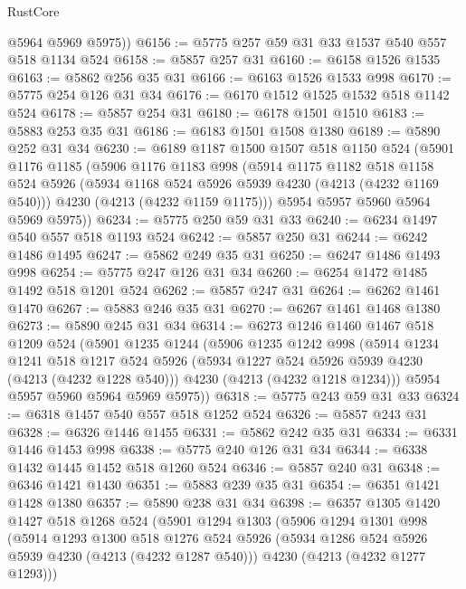 \begin{lexlean}{RustCore}
\begin{coremodule}
        @5964
        @5969
        @5975))
@6156 := @5775 @257 @59 @31 @33 @1537 @540 @557 @518 @1134 @524
@6158 := @5857 @257 @31
@6160 := @6158 @1526 @1535
@6163 := @5862 @256 @35 @31
@6166 := @6163 @1526 @1533 @998
@6170 := @5775 @254 @126 @31 @34
@6176 := @6170 @1512 @1525 @1532 @518 @1142 @524
@6178 := @5857 @254 @31
@6180 := @6178 @1501 @1510
@6183 := @5883 @253 @35 @31
@6186 := @6183 @1501 @1508 @1380
@6189 := @5890 @252 @31 @34
@6230 := @6189
    @1187
    @1500
    @1507
    @518
    @1150
    @524
    (@5901
      @1176
      @1185
      (@5906
        @1176
        @1183
        @998
        (@5914
          @1175
          @1182
          @518
          @1158
          @524
          @5926
          (@5934 @1168 @524 @5926 @5939 @4230 (@4213 (@4232 @1169 @540)))
          @4230
          (@4213 (@4232 @1159 @1175)))
        @5954
        @5957
        @5960
        @5964
        @5969
        @5975))
@6234 := @5775 @250 @59 @31 @33
@6240 := @6234 @1497 @540 @557 @518 @1193 @524
@6242 := @5857 @250 @31
@6244 := @6242 @1486 @1495
@6247 := @5862 @249 @35 @31
@6250 := @6247 @1486 @1493 @998
@6254 := @5775 @247 @126 @31 @34
@6260 := @6254 @1472 @1485 @1492 @518 @1201 @524
@6262 := @5857 @247 @31
@6264 := @6262 @1461 @1470
@6267 := @5883 @246 @35 @31
@6270 := @6267 @1461 @1468 @1380
@6273 := @5890 @245 @31 @34
@6314 := @6273
    @1246
    @1460
    @1467
    @518
    @1209
    @524
    (@5901
      @1235
      @1244
      (@5906
        @1235
        @1242
        @998
        (@5914
          @1234
          @1241
          @518
          @1217
          @524
          @5926
          (@5934 @1227 @524 @5926 @5939 @4230 (@4213 (@4232 @1228 @540)))
          @4230
          (@4213 (@4232 @1218 @1234)))
        @5954
        @5957
        @5960
        @5964
        @5969
        @5975))
@6318 := @5775 @243 @59 @31 @33
@6324 := @6318 @1457 @540 @557 @518 @1252 @524
@6326 := @5857 @243 @31
@6328 := @6326 @1446 @1455
@6331 := @5862 @242 @35 @31
@6334 := @6331 @1446 @1453 @998
@6338 := @5775 @240 @126 @31 @34
@6344 := @6338 @1432 @1445 @1452 @518 @1260 @524
@6346 := @5857 @240 @31
@6348 := @6346 @1421 @1430
@6351 := @5883 @239 @35 @31
@6354 := @6351 @1421 @1428 @1380
@6357 := @5890 @238 @31 @34
@6398 := @6357
    @1305
    @1420
    @1427
    @518
    @1268
    @524
    (@5901
      @1294
      @1303
      (@5906
        @1294
        @1301
        @998
        (@5914
          @1293
          @1300
          @518
          @1276
          @524
          @5926
          (@5934 @1286 @524 @5926 @5939 @4230 (@4213 (@4232 @1287 @540)))
          @4230
          (@4213 (@4232 @1277 @1293)))

\end{coremodule}
\end{lexlean}
